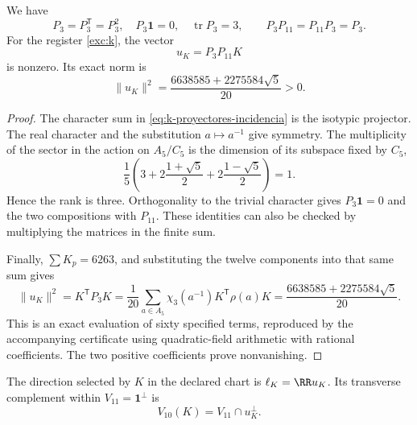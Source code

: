 \begin{lemma}
\label{lem:k-sector-no-nulo}
We have
\[
 P_3=P_3^{\mathsf T}=P_3^2,\quad
 P_3\mathbf1=0,\quad \operatorname{tr}P_3=3,
 \qquad P_3P_{11}=P_{11}P_3=P_3.
\]
For the register \eqref{exc:k}, the vector
\begin{equation}
 u_K=P_3P_{11}K
 \label{eq:k-vector-direccional}
\end{equation}
is nonzero. Its exact norm is
\begin{equation}
 \lVert u_K\rVert^2
 =\frac{6638585+2275584\sqrt5}{20}>0.
 \label{eq:k-norma-direccion}
\end{equation}
\end{lemma}
\begin{proof}
The character sum in \eqref{eq:k-proyectores-incidencia} is the
isotypic projector. The real character and the substitution \(a\mapsto a^{-1}\)
give symmetry. The multiplicity of the sector in the action on
\(A_5/C_5\) is the dimension of its subspace fixed by \(C_5\),
\[
 \frac15\left(3+2\frac{1+\sqrt5}{2}
                 +2\frac{1-\sqrt5}{2}\right)=1.
\]
Hence the rank is three. Orthogonality to the trivial character
gives \(P_3\mathbf1=0\) and the two compositions with \(P_{11}\).
These identities can also be checked by multiplying the
matrices in the finite sum.

Finally, \(\sum K_p=6263\), and substituting the twelve
components into that same sum gives
\[
 \lVert u_K\rVert^2=K^{\mathsf T}P_3K
 =\frac1{20}\sum_{a\in A_5}
                \chi_3(a^{-1})K^{\mathsf T}\rho(a)K
 =\frac{6638585+2275584\sqrt5}{20}.
\]
This is an exact evaluation of sixty specified terms,
reproduced by the accompanying certificate using quadratic-field
arithmetic with rational coefficients. The two positive coefficients prove nonvanishing.
\end{proof}

\begin{definition}
The direction selected by \(K\) in the declared chart is
\(\ell_K=\RR u_K\). Its transverse complement within
\(V_{11}=\mathbf1^\perp\) is
\[
 V_{10}(K)=V_{11}\cap u_K^\perp.
\]
\end{definition}

